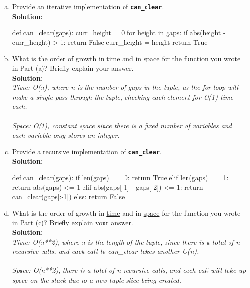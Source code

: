 \begin{enumerate}[(a)]
\item Provide an \underline{iterative} implementation of \texttt{\bfseries can\_clear}. \\
\textbf{Solution:}
\begin{python}
def can_clear(gaps):
    curr_height = 0
    for height in gaps:
        if abs(height - curr_height) > 1:
            return False
        curr_height = height
    return True
\end{python}

\item What is the order of growth in \underline{time} and in \underline{space} for the function you wrote in Part (a)?
Briefly explain your answer. \\
\textbf{Solution:} \\
\textit{Time: O(n), where n is the number of gaps in the tuple, as the for-loop will make a single
pass through the tuple, checking each element for O(1) time each. \\ \\
Space: O(1), constant space since there is a fixed number of variables and each variable only
stores an integer.}

\item Provide a \underline{recursive} implementation of \texttt{\bfseries can\_clear}. \\
\textbf{Solution:}
\begin{python}
def can_clear(gaps):
    if len(gaps) == 0:
        return True
    elif len(gaps) == 1:
        return abs(gaps) <= 1
    elif abs(gaps[-1] - gaps[-2]) <= 1:
        return can_clear(gaps[:-1])
    else:
        return False
\end{python}

\item What is the order of growth in \underline{time} and in \underline{space} for the function you wrote in Part (c)?
Briefly explain your answer. \\
\textbf{Solution:} \\
\textit{Time: O(n**2), where n is the length of the tuple, since there is a total of n recursive calls, and
each call to can\_clear takes another O(n). \\ \\
Space: O(n**2), there is a total of n recursive calls, and each call will take up space on the stack
due to a new tuple slice being created.}


\end{enumerate}
